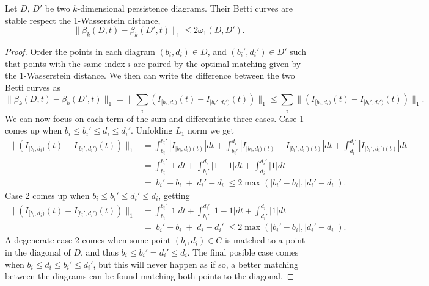 \begin{proposition} \label{prop:curves}
    Let $ D $, $ D' $ be two $ k$-dimensional persistence diagrams. Their Betti curves are stable respect the 1-Wasserstein distance,
    \begin{equation}
        \| \beta_k(D, t) - \beta_k(D', t) \|_1 \leq 2 \omega_1(D, D').
    \end{equation}
\end{proposition}
\begin{proof}
    Order the points in each diagram $ (b_i, d_i) \in D $, and  $ (b_i', d_i') \in D' $ such that points with the same index $ i $ are paired by the optimal matching given by the 1-Wasserstein distance. We then can write the difference between the two Betti curves as
    \begin{equation}
        \|\beta_k(D, t) - \beta_k(D', t)\|_1 = \| \sum_i \left(I_{[b_i, d_i)}(t) - I_{[b_i', d_i')}(t)\right)  \|_1 
        \leq \sum_i \| \left(I_{[b_i, d_i)}(t) - I_{[b_i', d_i')}(t)\right)  \|_1.
    \end{equation}
    We can now focus on each term of the sum and differentiate three cases. Case 1 comes up when $ b_i \leq b_i' \leq d_i \leq d_i' $. Unfolding $ L_1 $ norm we get 
    \begin{align}
        \|  \! \left(I_{[b_i, d_i)}(t) - I_{[b_i', d_i')}(t)\right) \! \|_1 &=
        \! \! \int_{b_i}^{b_i'} \left| I_{[b_i, d_i)(t)}\right| dt + \! \! \int_{b_i'}^{d_i} \left| I_{[b_i, d_i)(t)} - I_{[b_i', d_i')(t)}\right| dt + \! \! \int_{d_i}^{d_i'} \left| I_{[b_i', d_i')(t)}\right| dt \\
        &= \int_{b_i}^{b_i'} \left| 1 \right| dt + \int_{b_i'}^{d_i} \left| 1-1 \right| dt + \int_{d_i}^{d_i'} \left|1\right| dt \\
        &= |b_i' - b_i| + |d_i' - d_i| \leq 2 \max(|b_i' - b_i|, |d_i' - d_i|).
    \end{align}
    Case 2 comes up when $ b_i \leq b_i' \leq d_i' \leq d_i $, getting
    \begin{align}
        \|  \! \left(I_{[b_i, d_i)}(t) - I_{[b_i', d_i')}(t)\right) \! \|_1 &=
        \int_{b_i}^{b_i'} \left| 1 \right| dt + \int_{b_i'}^{d_i'} \left| 1-1 \right| dt + \int_{d_i'}^{d_i} \left|1\right| dt \\
        &= |b_i' - b_i| + |d_i - d_i'| \leq 2 \max(|b_i' - b_i|, |d_i' - d_i|).
    \end{align}
    A degenerate case 2 comes when some point $ (b_i, d_i) \in C $ is matched to a point in the diagonal of $ D $, and thus $ b_i \leq b_i' = d_i' \leq d_i $. The final posible case comes when $ b_i \leq d_i \leq b_i' \leq d_i' $, but this will never happen as if so, a better matching between the diagrams can be found matching both points to the diagonal.


\end{proof}
